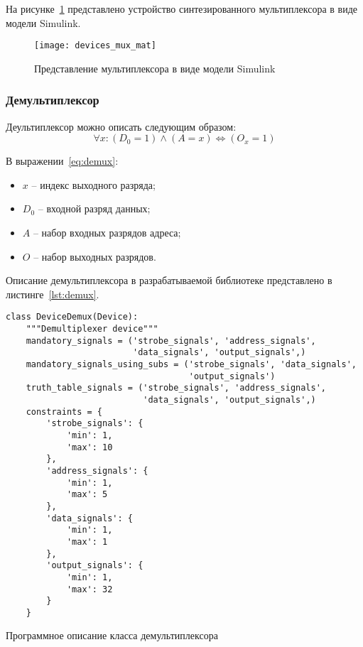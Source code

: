 \documentclass[document.tex]{subfiles}
\begin{document}
На рисунке~\ref{fig:devicemuxmat} представлено устройство
синтезированного мультиплексора в виде модели Simulink.

\begin{figure}[here]
\texttt{[image: devices\_mux\_mat]}
\caption{Представление мультиплексора в виде модели Simulink}
\label{fig:devicemuxmat}
\end{figure}

\clearpage

\subsubsection{Демультиплексор}

Деультиплексор можно описать следующим образом:
\begin{equation}
\label{eq:demux}
\forall x: (D_0 = 1) \wedge (A = x) \Leftrightarrow (O_x = 1)
\end{equation}

В выражении~\ref{eq:demux}:
\begin{itemize}[noitemsep]
  \item $x$ -- индекс выходного разряда;
  \item $D_0$ -- входной разряд данных;
  \item $A$ -- набор входных разрядов адреса;
  \item $O$ -- набор выходных разрядов.
\end{itemize}

Описание демультиплексора в разрабатываемой библиотеке представлено в
листинге~\ref{lst:demux}.

\begin{listing}[ht]
\begin{verbatim}
class DeviceDemux(Device):
    """Demultiplexer device"""
    mandatory_signals = ('strobe_signals', 'address_signals', 
                         'data_signals', 'output_signals',)
    mandatory_signals_using_subs = ('strobe_signals', 'data_signals', 
                                    'output_signals')
    truth_table_signals = ('strobe_signals', 'address_signals', 
                           'data_signals', 'output_signals',)
    constraints = {
        'strobe_signals': {
            'min': 1,
            'max': 10
        },
        'address_signals': {
            'min': 1,
            'max': 5
        },
        'data_signals': {
            'min': 1,
            'max': 1
        },
        'output_signals': {
            'min': 1,
            'max': 32
        }
    }
\end{verbatim}
\caption{Программное описание класса демультиплексора}
\label{lst:demux}
\end{listing}
\end{document}

